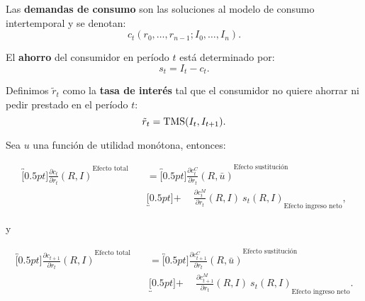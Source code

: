 \documentclass[8pt,a4paper]{extarticle}
\begin{document}
\begin{multicols}{3}
\begin{boxdef}
	Las \textbf{demandas de consumo} son las soluciones al modelo de consumo intertemporal y se denotan:
	\[
		c_t(r_0, \ldots, r_{n-1}; I_0, \ldots, I_n)
	.\] 
\end{boxdef}

\begin{boxdef}[Ahorro]
	El \textbf{ahorro} del consumidor en período $t$ está determinado por:
	\[
		s_t = I_t - c_t
	.\] 
\end{boxdef}

\begin{boxdef}
	Definimos $\tilde{r}_t$ como la \textbf{tasa de interés} tal que el consumidor no quiere ahorrar ni pedir prestado en el período $t$:
	\[
		\tilde{r}_t = \text{\normalfont TMS} (I_t, I_{t+1})
	.\] 
\end{boxdef}

\begin{boxtheo}
	Sea $u$ una función de utilidad monótona, entonces:
	
	\begin{equation*}
	\begin{aligned}
		\overbracket[0.5pt]{\frac{\partial c_t}{\partial r_t} (R, I)}^{\text{Efecto total}} \quad &= \overbracket[0.5pt]{\frac{\partial c_t^C}{\partial r_t} (R, \bar{u})}^{\text{Efecto sustitución}} \\
																						   & \underbracket[0.5pt]{ + \quad\ \frac{\partial c_t^M}{\partial r_t} (R, I)\ s_t (R, I)}_{\text{Efecto ingreso neto}},
	\end{aligned}
	\end{equation*}	

	y

	\begin{equation*}
	\begin{aligned}
		\overbracket[0.5pt]{\frac{\partial c_{t+1}}{\partial r_t} (R, I)}^{\text{Efecto total}} \quad &= \overbracket[0.5pt]{\frac{\partial c_{t+1}^C}{\partial r_t} (R, \bar{u})}^{\text{Efecto sustitución}} \\
																					   & \underbracket[0.5pt]{ + \quad\ \frac{\partial c_{t+1}^M}{\partial r_t} (R, I)\ s_t (R, I)}_{\text{Efecto ingreso neto}}.
	\end{aligned}
	\end{equation*}	
	
\end{boxtheo}

\sectionbreak


\end{multicols}
\end{document}
